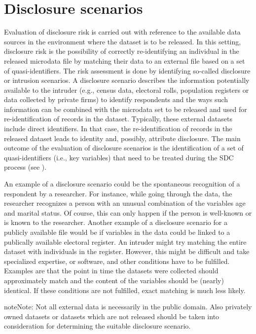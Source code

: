\documentclass[letterpaper,10pt,english]{sphinxmanual}
\begin{document}
\section{Disclosure scenarios}
\label{\detokenize{measure_risk:disclosure-scenarios}}
Evaluation of disclosure risk is carried out with reference to the
available data sources in the environment where the dataset is to be
released. In this setting, disclosure risk is the possibility of
correctly re-identifying an individual in the released microdata file by
matching their data to an external file based on a set of
quasi-identifiers. The risk assessment is done by identifying so-called
disclosure or intrusion scenarios. A disclosure scenario describes the
information potentially available to the intruder (e.g., census data,
electoral rolls, population registers or data collected by private
firms) to identify respondents and the ways such information can be
combined with the microdata set to be released and used for
re-identification of records in the dataset. Typically, these external
datasets include direct identifiers. In that case, the re-identification
of records in the released dataset leads to identity and, possibly,
attribute disclosure. The main outcome of the evaluation of disclosure
scenarios is the identification of a set of quasi-identifiers (i.e., key
variables) that need to be treated during the SDC process (see {\hyperref[\detokenize{measure_risk:elmp10}]{}}).

An example of a disclosure scenario could be the spontaneous recognition
of a respondent by a researcher. For instance, while going through the
data, the researcher recognizes a person with an unusual combination of
the variables age and marital status. Of course, this can only happen if
the person is well-known or is known to the researcher. Another example
of a disclosure scenario for a publicly available file would be if
variables in the data could be linked to a publically available
electoral register. An intruder might try matching the entire dataset
with individuals in the register. However, this might be difficult and
take specialized expertise, or software, and other conditions have to be
fulfilled. Examples are that the point in time the datasets were
collected should approximately match and the content of the variables
should be (nearly) identical. If these conditions are not fulfilled,
exact matching is much less likely.

\begin{sphinxadmonition}{note}{Note:}
Not all external data is
necessarily in the public domain. Also privately owned datasets or
datasets which are not released should be taken into consideration for
determining the suitable disclosure scenario.
\end{sphinxadmonition}
\end{document}
